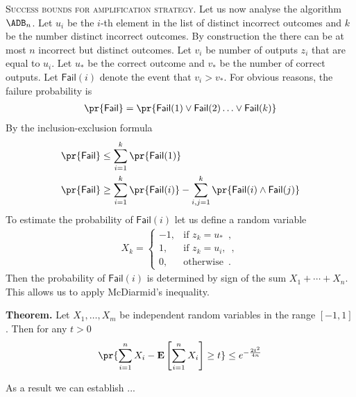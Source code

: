 \documentclass{crypto-exercise}
\begin{document}
\begin{solution}
\vspace*{2ex}
\noindent\textsc{Success bounds for amplification strategy.}
Let us now analyse the algorithm $\ADB_n$. 
Let $u_i$ be the $i$-th element in the list of distinct incorrect outcomes and $k$ be the number distinct incorrect outcomes. 
By construction the there can be at most $n$ incorrect but distinct outcomes.
Let $v_i$ be number of outputs $z_i$ that are equal to $u_i$.
Let $u_*$ be the correct outcome and $v_*$ be the number of correct outputs. 
Let $\mathsf{Fail}(i)$ denote the event that $v_i > v_*$. 
For obvious reasons, the failure probability is
\begin{align*}
\pr{\mathsf{Fail}}=\pr{\mathsf{Fail}(1)\vee \mathsf{Fail}(2) \ldots \vee\mathsf{Fail}(k) }
\end{align*}
By the inclusion-exclusion formula
\begin{align*}
\pr{\mathsf{Fail}}&\leq \sum_{i=1}^k \pr{\mathsf{Fail}(1)}\\
\pr{\mathsf{Fail}}&\geq \sum_{i=1}^k \pr{\mathsf{Fail}(i)} 
-\sum_{i,j=1}^k \pr{\mathsf{Fail}(i)\wedge \mathsf{Fail}(j)}
\end{align*}
To estimate the probability of $\mathsf{Fail}(i)$ let us define a random variable
\begin{align*}
X_k=
\begin{cases}
-1,  &\text{if } z_k=u_*\enspace,\\
1, &\text{if } z_k=u_i,\enspace,\\
0,  &\text{otherwise}\enspace.
\end{cases}
\end{align*}
Then the probability of $\mathsf{Fail}(i)$ is determined by sign of the sum $X_1+\cdots+X_{n}$.
This allows us to apply  McDiarmid's inequality.

\vspace*{1ex}
\noindent\textbf{Theorem.}
Let $X_1,\ldots, X_m$ be independent random variables in the range $[-1,1]$.
Then for any $t>0$
\begin{align*}
\pr{\sum_{i=1}^n X_i- \mathbf{E}\left[\sum_{i=1}^n X_i\right]\geq t}\leq e^{-\frac{2t^2}{4n}}
\end{align*}
 
As a result we can establish ...

\end{solution}
\end{document}
